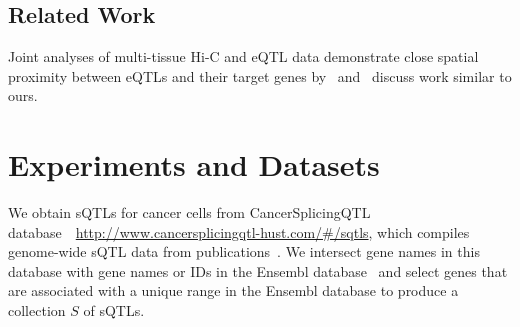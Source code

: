 \documentclass[11pt]{article}
\begin{document}
\subsection{Related Work}

Joint analyses of multi-tissue Hi-C and eQTL data demonstrate close spatial proximity
between eQTLs and their target genes by~\cite{yu2019} and~\cite{duggal2013} discuss work similar to ours. 

\section{Experiments and Datasets}

We obtain sQTLs for cancer cells from CancerSplicingQTL database~\cite{tian2018}~\url{http://www.cancersplicingqtl-hust.com/#/sqtls}, which
compiles genome-wide sQTL data from publications~\cite{}. We intersect gene names in this
database with gene names or IDs in the Ensembl
database~\cite{yates2019} and select genes that are associated with a
unique range in the Ensembl database to produce a collection $S$ of sQTLs.
\end{document}

